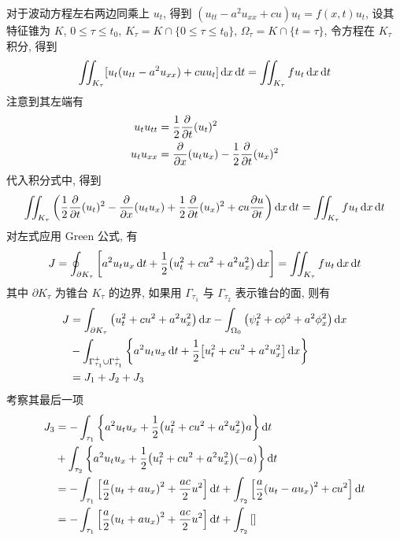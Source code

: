 \begin{solution}
对于波动方程左右两边同乘上 $u_t$, 得到
$(u_{tt} - a^2 u_{xx} + cu) u_t = f(x, t) u_t$, 设其特征锥为 $K$,
$0 \leq \tau \leq t_0$, $K_\tau = K \cap \{0 \leq \tau \leq t_0\}$,
$\Omega_\tau = K \cap \{t = \tau\}$, 令方程在 $K_\tau$ 积分, 得到
\[
\iint_{K_\tau} [ u_t(u_{tt} - a^2 u_{xx}) + c u u_t ] \operatorname{d\!} x \operatorname{d\!} t
= \iint_{K_\tau} f u_t \operatorname{d\!} x \operatorname{d\!} t
\]
注意到其左端有
\[ \begin{aligned}
  u_t u_{tt} &= \frac12{{\frac{\partial {}}{\partial {t}}}}(u_t)^2 \\
  u_t u_{xx} &= {{\frac{\partial {}}{\partial {x}}}} (u_t u_x) - \frac12{{\frac{\partial {}}{\partial {t}}}}(u_x)^2
\end{aligned} \]
代入积分式中, 得到
\[
\iint_{K_\tau} \left(
  \frac12{{\frac{\partial {}}{\partial {t}}}}(u_t)^2 - {{\frac{\partial {}}{\partial {x}}}} (u_t u_x)
  + \frac12{{\frac{\partial {}}{\partial {t}}}}(u_x)^2 + c u {\frac{\partial {u}}{\partial {t}}}
\right) \operatorname{d\!} x \operatorname{d\!} t
= \iint_{K_\tau} f u_t \operatorname{d\!} x \operatorname{d\!} t
\]
对左式应用 Green 公式, 有
\[
J = \oint_{\partial K_\tau} {\left[ {
    a^2 u_t u_x \operatorname{d\!} t + \frac12 {\left( {
        u_t^2 + c u^2 + a^2 u_x^2
    } \right)} \operatorname{d\!} x
} \right]} = \iint_{K_\tau} f u_t \operatorname{d\!} x \operatorname{d\!} t
\]
其中 $\partial K_\tau$ 为锥台 $K_\tau$ 的边界, 如果用 $\Gamma_{\tau_1}$ 与
$\Gamma_{\tau_2}$ 表示锥台的面, 则有
\[ \begin{aligned}
J &= \int_{\partial K_\tau} {\left( {
    u_t^2 + c u^2 + a^2 u_x^2
} \right)} \operatorname{d\!} x - \int_{\Omega_0} {\left( {
    \psi_t^2 + c \phi^2 + a^2 \phi_x^2
} \right)} \operatorname{d\!} x \\&- \int_{\Gamma_{\tau_1}^+ \cup \Gamma_{\tau_1}^+} {\left\{ {
    a^2 u_t u_x \operatorname{d\!} t + \frac12 {\left[ {
        u_t^2 + c u^2 + a^2 u_x^2
    } \right]} \operatorname{d\!} x
} \right\}}\\
&= J_1 + J_2 + J_3
\end{aligned} \]
考察其最后一项
\[ \begin{aligned}
J_3 &= -\int_{\tau_1} {\left\{ {
    a^2 u_t u_x + \frac12 {\left( {
        u_t^2 + c u^2 + a^2 u_x^2
    } \right)} a
} \right\}} \operatorname{d\!} t \\	&+ \int_{\tau_2} {\left\{ {
    a^2 u_t u_x + \frac12 {\left( {
        u_t^2 + c u^2 + a^2 u_x^2
    } \right)} (-a)
} \right\}} \operatorname{d\!} t \\
&= -\int_{\tau_1} {\left[ {
    \frac{a}{2} {\left( {
        u_t + a u_x
    } \right)}^2 + \frac{a c}{2}u^2
} \right]} \operatorname{d\!} t + \int_{\tau_2} {\left[ {
    \frac{a}{2} {\left( {
        u_t - a u_x
    } \right)}^2 + c u^2
} \right]} \operatorname{d\!} t \\
&= -\int_{\tau_1} {\left[ {
    \frac{a}{2} {\left( {
        u_t + a u_x
    } \right)}^2 + \frac{a c}{2}u^2
} \right]} \operatorname{d\!} t + \int_{\tau_2} {\left[ {
} \right]}
\end{aligned}\]
\end{solution}
